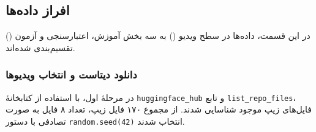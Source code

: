 \documentclass{article}
\begin{document}
\subsection{افراز داده‌ها}
در این قسمت، داده‌ها در سطح ویدیو () به سه بخش آموزش، اعتبارسنجی و آزمون () تقسیم‌بندی شده‌اند.

\subsubsection{دانلود دیتاست و انتخاب ویدیوها}
در مرحلۀ اول، با استفاده از کتابخانۀ \texttt{huggingface_hub} و تابع \texttt{list_repo_files}، فایل‌های زیپ موجود شناسایی شدند. از مجموع ۱۷۰ فایل زیپ، تعداد ۸ فایل به صورت تصادفی با دستور \texttt{random.seed(42)} انتخاب شدند. 
\end{document}
